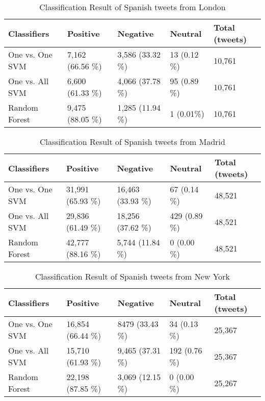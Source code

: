 \begin{table}[ht]
	\caption{Classification Result of Spanish tweets from London}
	\begin{tabular}{|l|p{1.8cm}|p{1.8cm}|p{1.8cm}|p{1.8cm}|} \hline
	Classifiers & Positive & Negative & Neutral & Total (tweets)\\ \hline
	
One vs. One SVM & 7,162 (66.56 \%)& 3,586 (33.32 \%)& 13 \newline(0.12 \%)& 10,761 \\ \hline
One vs. All SVM & 6,600 (61.33 \%)& 4,066 (37.78 \%)& 95 \newline(0.89 \%)& 10,761 \\ \hline
Random Forest   & 9,475 (88.05 \%)& 1,285 (11.94 \%)& 1 \newline(0.01\%) & 10,761 \\ \hline

	\end{tabular}
	\label{tab:result_london_es}
\end{table}


\begin{table}[ht]
	\caption{Classification Result of Spanish tweets from Madrid}
	\begin{tabular}{|l|p{1.8cm}|p{1.8cm}|p{1.8cm}|p{1.8cm}|} \hline
	Classifiers & Positive & Negative & Neutral & Total (tweets)\\ \hline
One vs. One SVM & 31,991 (65.93 \%) & 16,463 (33.93 \%)& 67 \newline(0.14 \%)& 48,521 \\ \hline
One vs. All SVM & 29,836 (61.49 \%)& 18,256 (37.62 \%)& 429 \newline(0.89 \%)& 48,521 \\ \hline
Random Forest   & 42,777 (88.16 \%)& 5,744 (11.84 \%) & 0 \newline(0.00 \%)  & 48,521 \\ \hline
	\end{tabular}
	\label{tab:result_madrid_es}
\end{table}

\begin{table}[ht]
	\caption{Classification Result of Spanish tweets from New York}
	\begin{tabular}{|l|p{1.8cm}|p{1.8cm}|p{1.8cm}|p{1.8cm}|} \hline
	Classifiers & Positive & Negative & Neutral & Total (tweets)\\ \hline
One vs. One SVM & 16,854 (66.44 \%)& 8479 (33.43 \%)& 34 \newline(0.13 \%) & 25,367 \\ \hline
One vs. All SVM & 15,710 (61.93 \%)& 9,465 (37.31 \%)& 192 \newline(0.76 \%)& 25,367 \\ \hline
Random Forest   & 22,198 (87.85 \%)& 3,069 (12.15 \%)& 0 \newline(0.00 \%)  & 25,267 \\ \hline
	\end{tabular}
	\label{tab:result_ny_es}
\end{table}

